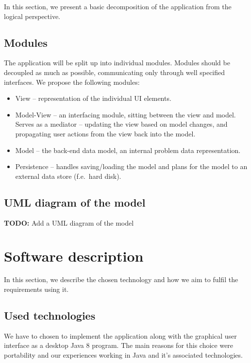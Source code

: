 \documentclass[10pt,a4paper,oneside]{article}
\newcommand{\TODO}[1]{{\textbf{TODO:} #1}} %
\begin{document}
In this section, we present a basic decomposition of the application from the logical perspective.

\subsection{Modules} \label{modules}

The application will be split up into individual modules.
Modules should be decoupled as much as possible, communicating only through well specified interfaces.
We propose the following modules:

\begin{itemize}
\item View -- representation of the individual UI elements.
\item Model-View -- an interfacing module, sitting between the view and model. Serves as a mediator -- updating the view based on model changes, and propagating user actions from the view back into the model.
\item Model -- the back-end data model, an internal problem data representation.
\item Persistence -- handles saving/loading the model and plans for the model to an external data store (f.e.~hard disk).
\end{itemize}

\subsection{UML diagram of the model}

\TODO Add a UML diagram of the model
 
 
 
 
 



\section{Software description}

In this section, we describe the chosen technology and how we aim to fulfil the requirements using it.

\subsection{Used technologies} \label{used-tech}

We have to chosen to implement the application along with the graphical user interface as a
desktop Java 8 program. The main reasons for this choice were portability and our experiences working in Java and it's associated technologies.
\end{document}
